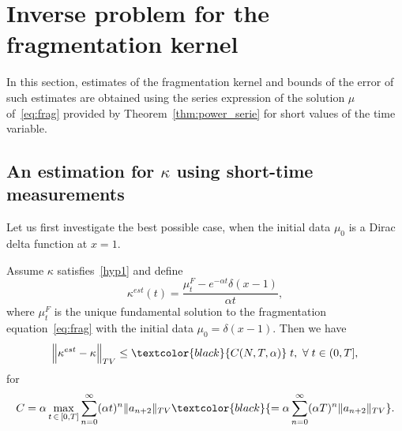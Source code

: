 \documentclass[AHL,Unicode,longabstracts,published]{cedram}
\renewcommand*\a{\alpha}
\newcommand{\MT}[1]{\textcolor{black}{#1}}
\let\oldforall\forall
\renewcommand*{\forall}{\mathrel{\oldforall}}
\begin{document}
\section{Inverse problem for the fragmentation kernel}\label{sec:short}


In this section, estimates of the fragmentation kernel and bounds of the error of such estimates are obtained using the series expression of the solution $\mu$ of~\eqref{eq:frag} provided by Theorem~\ref{thm:power_serie} for short values of the time variable.


\subsection{An estimation for \texorpdfstring{$\kappa$}{kappa} using short-time measurements} 
Let us first investigate the best possible case, when the initial data $\mu _0$ is a Dirac delta function at $x=1.$

\begin{theo}[An estimate for $\kappa$ using short-time measurements of the particles size distribution when initial condition is a delta function at $x=1$]\label{thm:short}
Assume $\kappa$ satisfies~\eqref{hyp1} and define
\begin{equation}\label{k_est_F}
\kappa^{est}(t)= \dfrac{\mu_t^{F} - e^{-\a t} \delta(x-1) }{\a t},
\end{equation}
where $\mu_t^{F}$ is the unique fundamental solution to the fragmentation equation~\eqref{eq:frag} with the initial data $\mu_0 = \delta(x-1)$. Then we have
\begin{equation}\label{estkappaC}
\Big\|\kappa^{est}-\kappa\Big\|_{TV} \leq \MT{C(N,T,\alpha)}\; t,\,\,\forall t\in (0, T], 
\end{equation}
for
\begin{equation}\label{constantcT}
C= \a \max_{t\,\in\,\left[0,T\right]}\sum\limits_{n=0}^{\infty} (\a t)^n \|a_{n+2}\|_{TV}
\MT{= \a \sum\limits_{n=0}^{\infty} (\a T)^n \|a_{n+2}\|_{TV}}.
\end{equation}
\end{theo}
\end{document}
